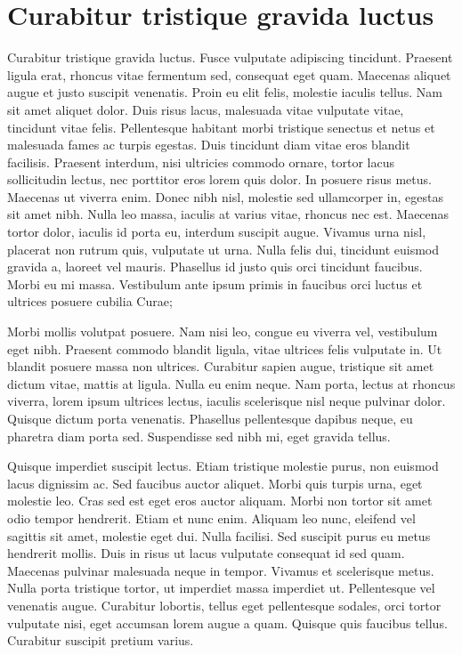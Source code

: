\section{Curabitur tristique gravida luctus}
Curabitur tristique gravida luctus.
Fusce vulputate adipiscing tincidunt.
Praesent ligula erat, rhoncus vitae fermentum sed, consequat eget quam.
Maecenas aliquet augue et justo suscipit venenatis.
Proin eu elit felis, molestie iaculis tellus.
Nam sit amet aliquet dolor.
Duis risus lacus, malesuada vitae vulputate vitae, tincidunt vitae felis.
Pellentesque habitant morbi tristique senectus et netus et malesuada fames ac turpis egestas.
Duis tincidunt diam vitae eros blandit facilisis.
Praesent interdum, nisi ultricies commodo ornare, tortor lacus sollicitudin lectus, nec porttitor eros lorem quis dolor.
In posuere risus metus.
Maecenas ut viverra enim.
Donec nibh nisl, molestie sed ullamcorper in, egestas sit amet nibh.
Nulla leo massa, iaculis at varius vitae, rhoncus nec est.
Maecenas tortor dolor, iaculis id porta eu, interdum suscipit augue.
Vivamus urna nisl, placerat non rutrum quis, vulputate ut urna.
Nulla felis dui, tincidunt euismod gravida a, laoreet vel mauris.
Phasellus id justo quis orci tincidunt faucibus.
Morbi eu mi massa.
Vestibulum ante ipsum primis in faucibus orci luctus et ultrices posuere cubilia Curae;

Morbi mollis volutpat posuere.
Nam nisi leo, congue eu viverra vel, vestibulum eget nibh.
Praesent commodo blandit ligula, vitae ultrices felis vulputate in.
Ut blandit posuere massa non ultrices.
Curabitur sapien augue, tristique sit amet dictum vitae, mattis at ligula.
Nulla eu enim neque.
Nam porta, lectus at rhoncus viverra, lorem ipsum ultrices lectus, iaculis scelerisque nisl neque pulvinar dolor.
Quisque dictum porta venenatis.
Phasellus pellentesque dapibus neque, eu pharetra diam porta sed.
Suspendisse sed nibh mi, eget gravida tellus.

Quisque imperdiet suscipit lectus.
Etiam tristique molestie purus, non euismod lacus dignissim ac.
Sed faucibus auctor aliquet.
Morbi quis turpis urna, eget molestie leo.
Cras sed est eget eros auctor aliquam.
Morbi non tortor sit amet odio tempor hendrerit.
Etiam et nunc enim.
Aliquam leo nunc, eleifend vel sagittis sit amet, molestie eget dui.
Nulla facilisi.
Sed suscipit purus eu metus hendrerit mollis.
Duis in risus ut lacus vulputate consequat id sed quam.
Maecenas pulvinar malesuada neque in tempor.
Vivamus et scelerisque metus.
Nulla porta tristique tortor, ut imperdiet massa imperdiet ut.
Pellentesque vel venenatis augue.
Curabitur lobortis, tellus eget pellentesque sodales, orci tortor vulputate nisi, eget accumsan lorem augue a quam.
Quisque quis faucibus tellus.
Curabitur suscipit pretium varius.

